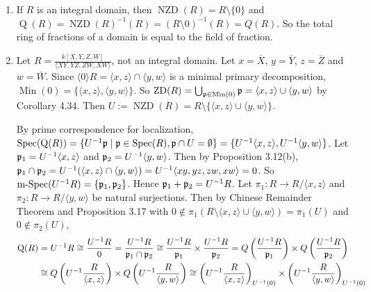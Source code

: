 \begin{example*}
    \begin{enumerate}
        \item If $R$ is an integral domain, then $\operatorname{NZD}(R) = R \setminus \{0\}$ and $\operatorname{Q}(R) = \operatorname{NZD}(R)^{-1}(R) = (R \setminus 0)^{-1}(R) = Q(R)$. So the total ring of fractions of a domain is equal to the field of fraction. 
        \item Let $R = \frac{k[X,Y,Z,W]}{\langle XY,YZ,ZW,XW \rangle}$, not an integral domain. 
            Let $x= \overbar{X}$, $y = \overbar{Y}$, $z = \overbar{Z}$ and $w = \overbar{W}$. Since $\langle 0 \rangle R = \langle x,z \rangle \cap \langle y,w \rangle$ is a minimal primary decomposition, $\operatorname{Min}(0) = \{\langle x,z \rangle, \langle y, w \rangle\}$. So $\operatorname{ZD}(R) = \bigcup_{\mathfrak{p} \in \operatorname{Min}(0)}\mathfrak{p} = \langle x, z\rangle \cup \langle y,w \rangle$ by Corollary 4.34. Then $U := \operatorname{NZD}(R) = R \setminus \{\langle x, z \rangle \cup \langle y, w\rangle\}$. \par 
            By prime correspondence for localization, $\operatorname{Spec}(\operatorname{Q}(R)) = \{U^{-1}\mathfrak{p} \mid \mathfrak{p} \in \operatorname{Spec}(R), \mathfrak{p} \cap U = \emptyset\} = \{U^{-1}\langle x,z \rangle, U^{-1}\langle y,w \rangle\}$. Let $\mathfrak{p}_1 = U^{-1}\langle x,z \rangle$ and $\mathfrak{p}_2 = U^{-1} \langle y,w \rangle$. Then by Proposition 3.12(b), $\mathfrak{p}_1 \cap \mathfrak{p}_2 = U^{-1}(\langle x,z \rangle \cap \langle y,w \rangle) = U^{-1} \langle xy,yz,zw,xw \rangle = 0$. So $\operatorname{m-Spec}(U^{-1}R) = \{\mathfrak{p}_1,\mathfrak{p}_2\}$. Hence $\mathfrak{p}_1 + \mathfrak{p}_2 = U^{-1}R$. Let $\pi_1: R \to R/\langle x, z \rangle$ and $\pi_2: R \to R/\langle y, w \rangle$ be natural surjections. Then by Chinese Remainder Theorem and Proposition 3.17 with $0 \not \in \pi_1(R \setminus \langle x, z \rangle \cup \langle y,w \rangle) = \pi_1(U)$ and $0 \not \in \pi_2(U)$,
            \begin{align*}
                \operatorname{Q}(R) &= U^{-1}R \cong \frac{U^{-1}R}{0} = \frac{U^{-1}R}{\ffp_1 \cap \ffp_2} \cong \frac{U^{-1}R}{\ffp_1} \times \frac{U^{-1}R}{\ffp_2} = Q\left(\frac{U^{-1}R}{\ffp_1}\right) \times Q\left(\frac{U^{-1}R}{\ffp_2}\right) \\
                &\cong Q\left(U^{-1}\frac{R}{\langle x,z \rangle}\right) \times Q\left(U^{-1}\frac{R}{\langle y,w \rangle}\right) \cong \left(U^{-1}\frac{R}{\langle x,z \rangle} \right)_{U^{-1}(0)} \times \left(U^{-1}\frac{R}{\langle y,w \rangle} \right)_{U^{-1}(0)} \\

\end{align*}
\end{enumerate}
\end{example*}

